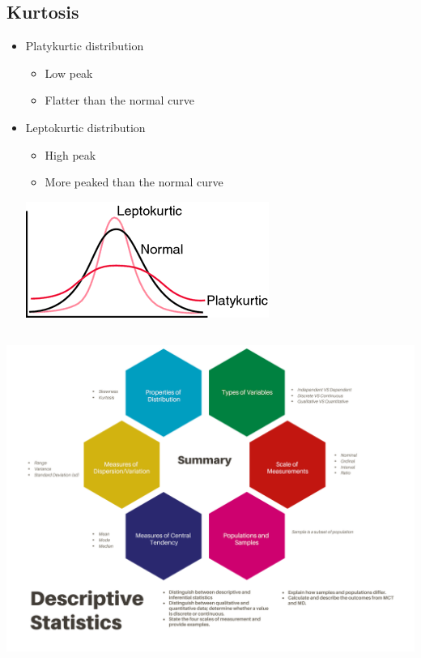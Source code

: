 \documentclass[]{article}
\providecommand{\tightlist}{%
  \setlength{\itemsep}{0pt}\setlength{\parskip}{0pt}}
\begin{document}
\hypertarget{kurtosis}{%
\subsection{Kurtosis}\label{kurtosis}}

\begin{itemize}
\item
  Platykurtic distribution

  \begin{itemize}
  \tightlist
  \item
    Low peak
  \item
    Flatter than the normal curve
  \end{itemize}
\item
  Leptokurtic distribution

  \begin{itemize}
  \tightlist
  \item
    High peak
  \item
    More peaked than the normal curve
  \end{itemize}

  \includegraphics[width=0.8\linewidth]{figure/kurtosis}
\end{itemize}

\hypertarget{section}{%
\subsection{}\label{section}}

\includegraphics[width=0.85\linewidth]{figure/summary-Trans}
\end{document}
